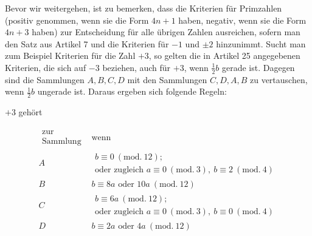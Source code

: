 Bevor wir weitergehen, ist zu bemerken, dass die Kriterien für Primzahlen (positiv genommen, wenn sie die Form $4n+1$ haben, negativ, wenn sie die Form $4n+3$ haben) zur Entscheidung für alle übrigen Zahlen ausreichen, sofern man den Satz aus Artikel 7 und die Kriterien für $-1$ und $\pm2$ hinzunimmt. Sucht man zum Beispiel Kriterien für die Zahl $+3$, so gelten die in Artikel 25 angegebenen Kriterien, die sich auf $-3$ beziehen, auch für $+3$, wenn $\frac12b$ gerade ist. Dagegen sind die Sammlungen $A,B,C,D$ mit den Sammlungen $C,D,A,B$ zu vertauschen, wenn $\frac12b$ ungerade ist. Daraus ergeben sich folgende Regeln:


%
\begin{center}$+3$ gehört\end{center}
{\small
\[
\begin{array}{c|l}
\substack{\text{zur}\\\text{Sammlung}}&\text{wenn}\\
A&\begin{aligned}b\equiv0\ (\mathrm{mod.}\ 12);\\\text{oder zugleich }a\equiv0\ (\mathrm{mod.}\ 3),\ b\equiv2\ (\mathrm{mod.}\ 4)\end{aligned}\\
B&b\equiv8a\text{ oder }10a\ (\mathrm{mod.}\ 12)\\
C&\begin{aligned}b\equiv6a\ (\mathrm{mod.}\ 12);\\\text{oder zugleich }a\equiv0\ (\mathrm{mod.}\ 3),\ b\equiv0\ (\mathrm{mod.}\ 4)\end{aligned}\\
D&b\equiv2a\text{ oder }4a\ (\mathrm{mod.}\ 12)
\end{array}
\]
}

